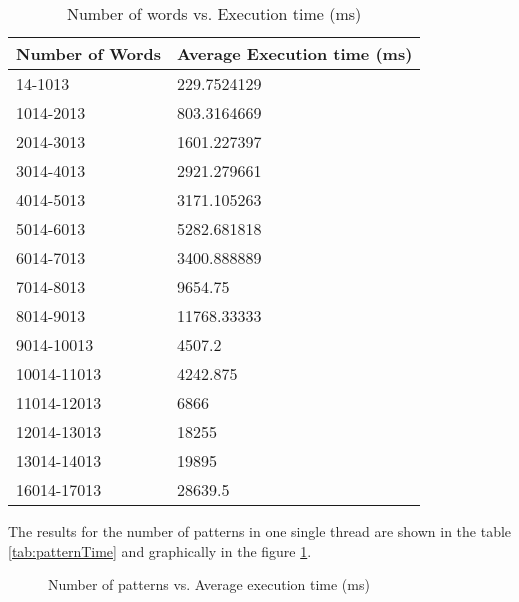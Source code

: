 \begin{table}\centering
	\caption{Number of words vs. Execution time (ms)}\label{tab:wordsTime}
   	\begin{tabular}{ | p{4cm\textwidth} | p{4cm\textwidth} |}
   	\hline

\textbf{Number of Words}  & \textbf{Average Execution time (ms)}       \\\hline
14-1013     & 229.7524129 \\\hline
1014-2013   & 803.3164669 \\\hline
2014-3013   & 1601.227397 \\\hline
3014-4013   & 2921.279661 \\\hline
4014-5013   & 3171.105263 \\\hline
5014-6013   & 5282.681818 \\\hline
6014-7013   & 3400.888889 \\\hline
7014-8013   & 9654.75     \\\hline
8014-9013   & 11768.33333 \\\hline
9014-10013  & 4507.2      \\\hline
10014-11013 & 4242.875    \\\hline
11014-12013 & 6866        \\\hline
12014-13013 & 18255       \\\hline
13014-14013 & 19895       \\\hline
16014-17013 & 28639.5    \\\hline

    \end{tabular}
\end{table}


The results for the number of patterns in one single thread are shown in the table \ref{tab:patternTime} and graphically in the figure \ref{fig:patternTime}.

\begin{figure}\centering
	\caption{Number of patterns vs. Average execution time (ms)}\label{fig:patternTime}
\end{figure}


